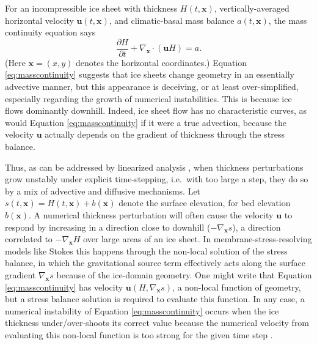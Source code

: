 \documentclass[review]{igs}
\newcommand\bu{\mathbf{u}}
\newcommand\bx{\mathbf{x}}
\newcommand{\Divx}{\nabla_\bx \cdot}
\newcommand{\gradx}{\nabla_\bx}
\begin{document}
For an incompressible ice sheet with thickness $H(t,\bx)$, vertically-averaged horizontal velocity $\bu(t,\bx)$, and climatic-basal mass balance $a(t,\bx)$, the mass continuity equation says
\begin{equation}
\frac{\partial H}{\partial t} + \Divx \left(\bu H\right) = a. \label{eq:masscontinuity}
\end{equation}
(Here $\bx=(x,y)$ denotes the horizontal coordinates.)  Equation \eqref{eq:masscontinuity} suggests that ice sheets change geometry in an essentially advective manner, but this appearance is deceiving, or at least over-simplified, especially regarding the growth of numerical instabilities.  This is because ice flows dominantly downhill.  Indeed, ice sheet flow has no characteristic curves, as would Equation \eqref{eq:masscontinuity} if it were a true advection, because the velocity $\bu$ actually depends on the gradient of thickness through the stress balance.

Thus, as can be addressed by linearized analysis \citep{Robinsonetal2022}, when thickness perturbations grow unstably under explicit time-stepping, i.e.~with too large a step, they do so by a mix of  advective and diffusive mechanisms.  Let $s(t,\bx)=H(t,\bx)+b(\bx)$ denote the surface elevation, for bed elevation $b(\bx)$.  A numerical thickness perturbation will often cause the velocity $\bu$ to respond by increasing in a direction close to downhill ($-\gradx s$), a direction correlated to $-\gradx H$ over large areas of an ice sheet.  In membrane-stress-resolving models like Stokes this happens through the non-local solution of the stress balance, in which the gravitational source term effectively acts along the surface gradient $\gradx s$ because of the ice-domain geometry.  One might write that Equation \eqref{eq:masscontinuity} has velocity $\bu(H,\gradx s)$, a non-local function of geometry, but a stress balance solution is required to evaluate this function.  In any case, a numerical instability of Equation \eqref{eq:masscontinuity} occurs when the ice thickness under/over-shoots its correct value because the numerical velocity from evaluating this non-local function is too strong for the given time step \citep{LeVeque2007}.
\end{document}
